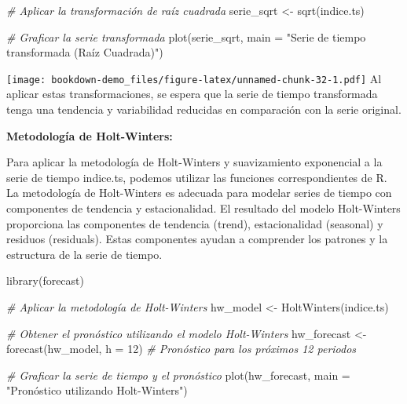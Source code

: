 \documentclass[
]{book}
\newenvironment{Shaded}{\begin{snugshade}}{\end{snugshade}}
\newcommand{\AttributeTok}[1]{\textcolor[rgb]{0.77,0.63,0.00}{#1}}
\newcommand{\CommentTok}[1]{\textcolor[rgb]{0.56,0.35,0.01}{\textit{#1}}}
\newcommand{\DecValTok}[1]{\textcolor[rgb]{0.00,0.00,0.81}{#1}}
\newcommand{\FunctionTok}[1]{\textcolor[rgb]{0.00,0.00,0.00}{#1}}
\newcommand{\NormalTok}[1]{#1}
\newcommand{\OtherTok}[1]{\textcolor[rgb]{0.56,0.35,0.01}{#1}}
\newcommand{\StringTok}[1]{\textcolor[rgb]{0.31,0.60,0.02}{#1}}
\begin{document}
\begin{Shaded}
\begin{Highlighting}[]
\CommentTok{\# Aplicar la transformación de raíz cuadrada}
\NormalTok{serie\_sqrt }\OtherTok{\textless{}{-}} \FunctionTok{sqrt}\NormalTok{(indice.ts)}

\CommentTok{\# Graficar la serie transformada}
\FunctionTok{plot}\NormalTok{(serie\_sqrt, }\AttributeTok{main =} \StringTok{"Serie de tiempo transformada (Raíz Cuadrada)"}\NormalTok{)}
\end{Highlighting}
\end{Shaded}

\texttt{[image: bookdown-demo\_files/figure-latex/unnamed-chunk-32-1.pdf]}
Al aplicar estas transformaciones, se espera que la serie de tiempo transformada tenga una tendencia y variabilidad reducidas en comparación con la serie original.

\textbf{Metodología de Holt-Winters:}

Para aplicar la metodología de Holt-Winters y suavizamiento exponencial a la serie de tiempo indice.ts, podemos utilizar las funciones correspondientes de R. La metodología de Holt-Winters es adecuada para modelar series de tiempo con componentes de tendencia y estacionalidad.
El resultado del modelo Holt-Winters proporciona las componentes de tendencia (trend), estacionalidad (seasonal) y residuos (residuals). Estas componentes ayudan a comprender los patrones y la estructura de la serie de tiempo.

\begin{Shaded}
\begin{Highlighting}[]
\FunctionTok{library}\NormalTok{(forecast)}

\CommentTok{\# Aplicar la metodología de Holt{-}Winters}
\NormalTok{hw\_model }\OtherTok{\textless{}{-}} \FunctionTok{HoltWinters}\NormalTok{(indice.ts)}

\CommentTok{\# Obtener el pronóstico utilizando el modelo Holt{-}Winters}
\NormalTok{hw\_forecast }\OtherTok{\textless{}{-}} \FunctionTok{forecast}\NormalTok{(hw\_model, }\AttributeTok{h =} \DecValTok{12}\NormalTok{)  }\CommentTok{\# Pronóstico para los próximos 12 periodos}

\CommentTok{\# Graficar la serie de tiempo y el pronóstico}
\FunctionTok{plot}\NormalTok{(hw\_forecast, }\AttributeTok{main =} \StringTok{"Pronóstico utilizando Holt{-}Winters"}\NormalTok{)}
\end{Highlighting}
\end{Shaded}
\end{document}
